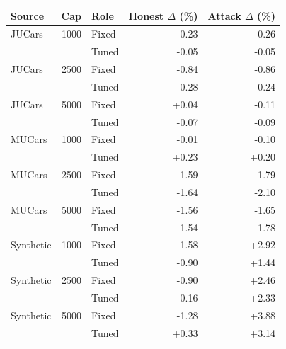 \documentclass[pdflatex,sn-nature]{sn-jnl}
\begin{document}
\begin{table}[t]
{\begin{minipage}{\linewidth}
\begin{tabular}{lrlrr}
\toprule
Source & Cap & Role & Honest $\Delta$ (\%) & Attack $\Delta$ (\%)\\
\midrule
JUCars & 1000 & Fixed & -0.23 & -0.26\\
 &  & Tuned & -0.05 & -0.05\\
\midrule
JUCars & 2500 & Fixed & -0.84 & -0.86\\
 &  & Tuned & -0.28 & -0.24\\
\midrule
JUCars & 5000 & Fixed & +0.04 & -0.11\\
 &  & Tuned & -0.07 & -0.09\\
\midrule
MUCars & 1000 & Fixed & -0.01 & -0.10\\
 &  & Tuned & +0.23 & +0.20\\
\midrule
MUCars & 2500 & Fixed & -1.59 & -1.79\\
 &  & Tuned & -1.64 & -2.10\\
\midrule
MUCars & 5000 & Fixed & -1.56 & -1.65\\
 &  & Tuned & -1.54 & -1.78\\
\midrule
Synthetic & 1000 & Fixed & -1.58 & +2.92\\
 &  & Tuned & -0.90 & +1.44\\
\midrule
Synthetic & 2500 & Fixed & -0.90 & +2.46\\
 &  & Tuned & -0.16 & +2.33\\
\midrule
Synthetic & 5000 & Fixed & -1.28 & +3.88\\
 &  & Tuned & +0.33 & +3.14\\
\bottomrule
\end{tabular}
\end{minipage}}
\ifdim\dimexpr\ht0+\dp0\relax>.72\textheight
\resizebox*{!}{.72\textheight}{\usebox0}
\else\usebox0\fi
\end{table}
\end{document}
